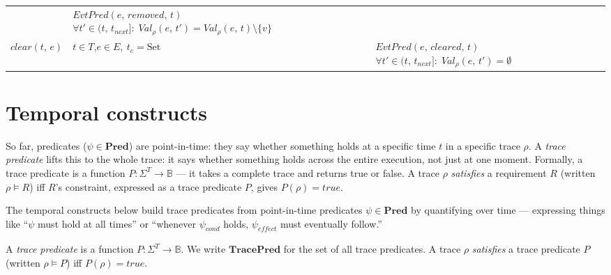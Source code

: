 \begin{tabularx}{\textwidth}{lXX}
                       & $\mathit{EvtPred}(e,\, \mathit{removed},\, t)$ \newline $\forall t' \in (t,\, t_{\mathit{next}}]:\; \mathit{Val}_\rho(e,\, t') = \mathit{Val}_\rho(e,\, t) \setminus \{v\}$                                                  \\[4pt]
    $\mathit{clear}(t,\, e)$
                       & $t \in T$,\newline $e \in E,\ t_e = \text{Set}$
                       & $\mathit{EvtPred}(e,\, \mathit{cleared},\, t)$ \newline $\forall t' \in (t,\, t_{\mathit{next}}]:\; \mathit{Val}_\rho(e,\, t') = \emptyset$                                                                                        \\
    \bottomrule
\end{tabularx}
\medskip

\section{Temporal constructs}

So far, predicates ($\psi \in \mathbf{Pred}$) are point-in-time: they say whether something holds at a specific time $t$ in a specific trace $\rho$.
A \emph{trace predicate} lifts this to the whole trace: it says whether something holds across the entire execution, not just at one moment.
Formally, a trace predicate is a function $P : \Sigma^T \to \mathbb{B}$ — it takes a complete trace and returns true or false.
A trace $\rho$ \emph{satisfies} a requirement $R$ (written $\rho \models R$) iff $R$'s constraint, expressed as a trace predicate $P$, gives $P(\rho) = \mathit{true}$.

The temporal constructs below build trace predicates from point-in-time predicates $\psi \in \mathbf{Pred}$ by quantifying over time — expressing things like ``$\psi$ must hold at all times'' or ``whenever $\psi_{\mathit{cond}}$ holds, $\psi_{\mathit{effect}}$ must eventually follow.''

\begin{definition}\label{def:trace_predicate}
    A \emph{trace predicate} is a function $P : \Sigma^T \to \mathbb{B}$.
    We write $\mathbf{TracePred}$ for the set of all trace predicates.
    A trace $\rho$ \emph{satisfies} a trace predicate $P$ (written $\rho \models P$) iff $P(\rho) = \mathit{true}$.
\end{definition}

